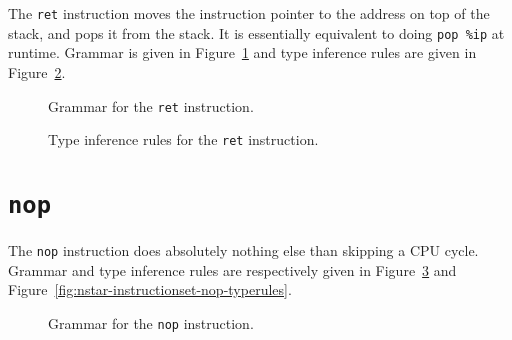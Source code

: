 The \texttt{ret} instruction moves the instruction pointer to the address on top of the stack, and pops it from the stack.
It is essentially equivalent to doing \texttt{pop \%ip} at runtime.
Grammar is given in Figure~\ref{fig:nstar-instructionset-ret-grammar} and type inference rules are given in Figure~\ref{fig:nstar-instructionset-ret-typerules}.

\begin{figure}[H]
  \centering


  \caption{Grammar for the \texttt{ret} instruction.}
  \label{fig:nstar-instructionset-ret-grammar}
\end{figure}

\begin{figure}[H]
  \centering


  \caption{Type inference rules for the \texttt{ret} instruction.}
  \label{fig:nstar-instructionset-ret-typerules}
\end{figure}

\section{\texttt{nop}}\label{sec:nstar-instructionset-nop}

The \texttt{nop} instruction does absolutely nothing else than skipping a CPU cycle.
Grammar and type inference rules are respectively given in Figure~\ref{fig:nstar-instructionset-nop-grammar} and Figure~\ref{fig:nstar-instructionset-nop-typerules}.

\begin{figure}[H]
  \centering


  \caption{Grammar for the \texttt{nop} instruction.}
  \label{fig:nstar-instructionset-nop-grammar}
\end{figure}

